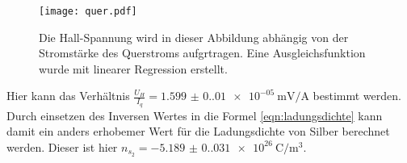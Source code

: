 \begin{figure}
  \centering
  \texttt{[image: quer.pdf]}
  \caption{Die Hall-Spannung wird in dieser Abbildung abhängig von der Stromstärke des Querstroms aufgrtragen. Eine Ausgleichsfunktion wurde mit linearer Regression erstellt.}
  \label{fig:plot}
\end{figure}

Hier kann das Verhältnis $\frac{U_H}{I_q}=\qty{1.599(0.010)e-05}{\milli\volt\per\ampere}$ bestimmt werden.
Durch einsetzen des Inversen Wertes in die Formel \ref{eqn:ladungsdichte} kann damit ein anders erhobemer Wert für die Ladungsdichte von Silber berechnet werden.
Dieser ist hier $n_{s_2}=\qty{-5.189(0.031)e+26}{\coulomb\per\cubic\meter}$.

